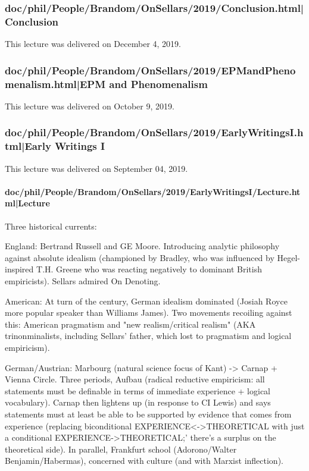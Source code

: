 \documentclass[12pt,a4paper]{report}
\begin{document}
\subsubsection{doc/phil/People/Brandom/OnSellars/2019/Conclusion.html|Conclusion}
This lecture was delivered on December 4, 2019.

\subsubsection{doc/phil/People/Brandom/OnSellars/2019/EPMandPhenomenalism.html|EPM and Phenomenalism}
This lecture was delivered on October 9, 2019.

\subsubsection{doc/phil/People/Brandom/OnSellars/2019/EarlyWritingsI.html|Early Writings I}
This lecture was delivered on September 04, 2019.

\paragraph{doc/phil/People/Brandom/OnSellars/2019/EarlyWritingsI/Lecture.html|Lecture}

Three historical currents:

England: Bertrand Russell and GE Moore. Introducing analytic philosophy against absolute idealism (championed by Bradley, who was influenced by Hegel-inspired T.H. Greene who was reacting negatively to dominant British empiricists). Sellars admired On Denoting.

American: At turn of the century, German idealism dominated (Josiah Royce more popular speaker than Williams James). Two movements recoiling against this: American pragmatism and "new realism/critical realism" (AKA trinonminalists, including Sellars' father, which lost to pragmatism and logical empiricism).

German/Austrian: Marbourg (natural science focus of Kant) -> Carnap + Vienna Circle. Three periods, Aufbau (radical reductive empiricism: all statements must be definable in terms of immediate experience + logical vocabulary). Carnap then lightens up (in response to CI Lewis) and says statements must at least be able to be supported by evidence that comes from experience (replacing biconditional EXPERIENCE<->THEORETICAL with just a conditional EXPERIENCE->THEORETICAL;' there's a surplus on the theoretical side).
In parallel, Frankfurt school (Adorono/Walter Benjamin/Habermas), concerned with culture (and with Marxist inflection).
\end{document}
